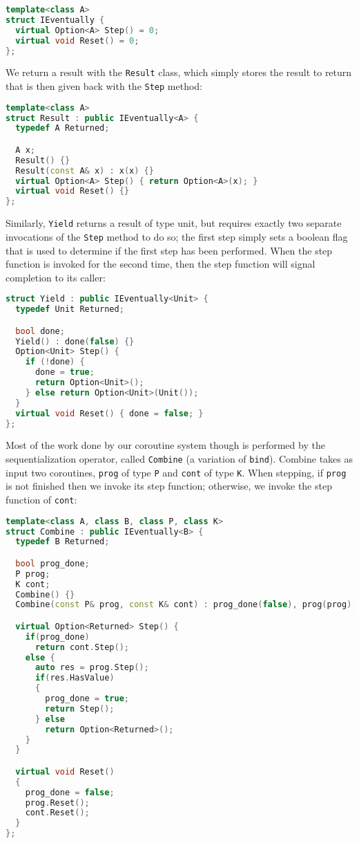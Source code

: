 \begin{lstlisting}[language=C++]
template<class A>
struct IEventually {
  virtual Option<A> Step() = 0;
  virtual void Reset() = 0;
};
\end{lstlisting}

We return a result with the \texttt{Result} class, which simply stores the result to return that is then given back with the \texttt{Step} method:

\begin{lstlisting}[language=C++]
template<class A>
struct Result : public IEventually<A> {
  typedef A Returned;

  A x;
  Result() {}
  Result(const A& x) : x(x) {}
  virtual Option<A> Step() { return Option<A>(x); }
  virtual void Reset() {}
};
\end{lstlisting}

Similarly, \texttt{Yield} returns a result of type unit, but requires exactly two separate invocations of the \texttt{Step} method to do so; the first step simply sets a boolean flag that is used to determine if the first step has been performed. When the step function is invoked for the second time, then the step function will signal completion to its caller:

\begin{lstlisting}[language=C++]
struct Yield : public IEventually<Unit> {
  typedef Unit Returned;

  bool done;
  Yield() : done(false) {}
  Option<Unit> Step() { 
    if (!done) { 
      done = true;
      return Option<Unit>(); 
    } else return Option<Unit>(Unit());
  }
  virtual void Reset() { done = false; }
};
\end{lstlisting}

Most of the work done by our coroutine system though is performed by the sequentialization operator, called \texttt{Combine} (a variation of \texttt{bind}). Combine takes as input two coroutines, \texttt{prog} of type \texttt{P} and \texttt{cont} of type \texttt{K}. When stepping, if \texttt{prog} is not finished then we invoke its step function; otherwise, we invoke the step function of \texttt{cont}:

\begin{lstlisting}[language=C++]
template<class A, class B, class P, class K>
struct Combine : public IEventually<B> {
  typedef B Returned;

  bool prog_done;
  P prog;
  K cont;
  Combine() {}
  Combine(const P& prog, const K& cont) : prog_done(false), prog(prog), cont(cont) {}

  virtual Option<Returned> Step() {
    if(prog_done)
      return cont.Step();
    else {
      auto res = prog.Step();
      if(res.HasValue)
      {
        prog_done = true;
        return Step();
      } else
        return Option<Returned>();
    }
  }

  virtual void Reset() 
  {
    prog_done = false;
    prog.Reset();
    cont.Reset();
  }
};
\end{lstlisting}

